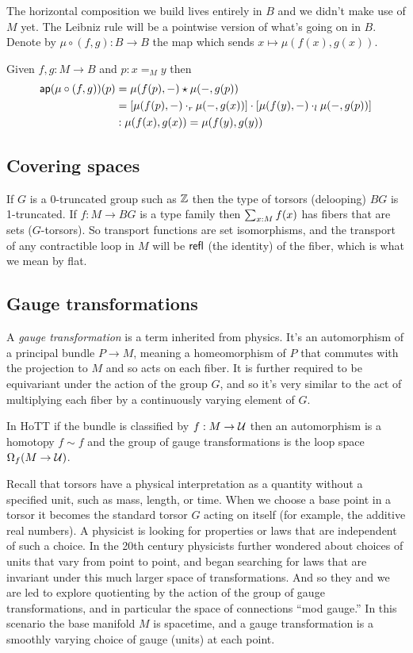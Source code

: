 \documentclass[12pt]{article}
\begin{document}
The horizontal composition we build lives entirely in \( B \) and we didn't make use of \( M \) yet. The Leibniz rule will be a pointwise version of what's going on in \( B \). Denote by \( \mu\circ(f,g):B\to B \) the map which sends \( x\mapsto \mu(f(x),g(x)) \).

\begin{mylemma}
Given \( f, g:M\to B \) and \( p:x=_M y \) then 
\begin{align*}
 \mathsf{ap}(\mu\circ(f,g))(p)&=\mu(f(p),-)\star\mu(-,g(p))\\
 &=\left[\mu(f(p),-)\cdot_r \mu(-,g(x))\right]\cdot \left[\mu(f(y),-)\cdot_l\mu(-,g(p))\right]\\
 &:\mu(f(x),g(x))=\mu(f(y),g(y))
\end{align*}
\end{mylemma}

\subsection{Covering spaces}

If \( G \) is a 0-truncated group such as \( \mathbb{Z} \) then the type of torsors (delooping) \( BG \) is 1-truncated. If \( f:M\to BG \) is a type family then \( \sum_{x:M}f(x) \) has fibers that are sets (\( G \)-torsors). So transport functions are set isomorphisms, and the transport of any contractible loop in \( M \) will be \( \mathsf{refl} \) (the identity) of the fiber, which is what we mean by flat.

\subsection{Gauge transformations}

A \emph{gauge transformation} is a term inherited from physics. It's an automorphism of a principal bundle \( P\to M \), meaning a homeomorphism of \( P \) that commutes with the projection to \( M \) and so acts on each fiber. It is further required to be equivariant under the action of the group \( G \), and so it's very similar to the act of multiplying each fiber by a continuously varying element of \( G \).

In HoTT if the bundle is classified by \( f:M\to \mathcal{U} \) then an automorphism is a homotopy \( f\sim f \) and the group of gauge transformations is the loop space \( \Omega_f(M\to \mathcal{U}) \). 

Recall that torsors have a physical interpretation as a quantity without a specified unit, such as mass, length, or time. When we choose a base point in a torsor it becomes the standard torsor \( G \) acting on itself (for example, the additive real numbers). A physicist is looking for properties or laws that are independent of such a choice. In the 20th century physicists further wondered about choices of units that vary from point to point, and began searching for laws that are invariant under this much larger space of transformations. And so they and we are led to explore quotienting by the action of the group of gauge transformations, and in particular the space of connections ``mod gauge.'' In this scenario the base manifold \( M \) is spacetime, and a gauge transformation is a smoothly varying choice of gauge (units) at each point.
\end{document}
